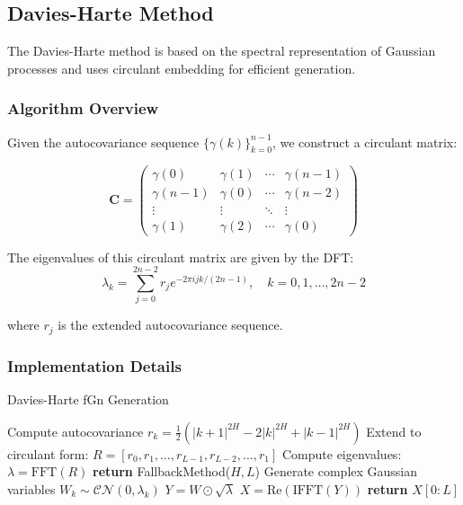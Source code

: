 \documentclass[11pt,a4paper]{article}
\begin{document}
\subsection{Davies-Harte Method}

The Davies-Harte method is based on the spectral representation of Gaussian processes and uses circulant embedding for efficient generation.

\subsubsection{Algorithm Overview}

Given the autocovariance sequence $\{\gamma(k)\}_{k=0}^{n-1}$, we construct a circulant matrix:

\begin{equation}
\mathbf{C} = \begin{pmatrix}
\gamma(0) & \gamma(1) & \cdots & \gamma(n-1) \\
\gamma(n-1) & \gamma(0) & \cdots & \gamma(n-2) \\
\vdots & \vdots & \ddots & \vdots \\
\gamma(1) & \gamma(2) & \cdots & \gamma(0)
\end{pmatrix}
\end{equation}

The eigenvalues of this circulant matrix are given by the DFT:
\begin{equation}
\lambda_k = \sum_{j=0}^{2n-2} r_j e^{-2\pi i jk/(2n-1)}, \quad k = 0, 1, \ldots, 2n-2
\end{equation}

where $r_j$ is the extended autocovariance sequence.

\subsubsection{Implementation Details}

\begin{algorithm}
\caption{Davies-Harte fGn Generation}
\begin{algorithmic}[1]
    \State Compute autocovariance $r_k = \frac{1}{2}(|k+1|^{2H} - 2|k|^{2H} + |k-1|^{2H})$
    \State Extend to circulant form: $R = [r_0, r_1, \ldots, r_{L-1}, r_{L-2}, \ldots, r_1]$
    \State Compute eigenvalues: $\lambda = \text{FFT}(R)$
    \If{$\min(\lambda) < -\epsilon$}
        \State \textbf{return} FallbackMethod($H, L$)
    \EndIf
    \State Generate complex Gaussian variables $W_k \sim \mathcal{CN}(0, \lambda_k)$
    \State $Y = W \odot \sqrt{\lambda}$
    \State $X = \text{Re}(\text{IFFT}(Y))$
    \State \textbf{return} $X[0:L]$
\EndProcedure
\end{algorithmic}
\end{algorithm}
\end{document}
